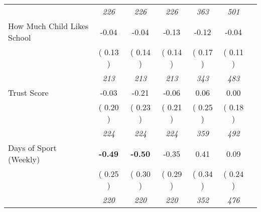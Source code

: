 \begin{tabular}{l c c c c c c}
& \textit{ 226 } & \textit{ 226 } & \textit{ 226 } & \textit{ 363 } & \textit{ 501 } \\
How Much Child Likes School &     -0.04 &     -0.04 &     -0.13 &     -0.12 &     -0.04 \\
& (     0.13 ) & (     0.14 ) & (     0.14 ) & (     0.17 ) & (     0.11 ) \\
& \textit{ 213 } & \textit{ 213 } & \textit{ 213 } & \textit{ 343 } & \textit{ 483 } \\
Trust Score &     -0.03 &     -0.21 &     -0.06 &      0.06 &      0.00 \\
& (     0.20 ) & (     0.23 ) & (     0.21 ) & (     0.25 ) & (     0.18 ) \\
& \textit{ 224 } & \textit{ 224 } & \textit{ 224 } & \textit{ 359 } & \textit{ 492 } \\
Days of Sport (Weekly) & \textbf{     -0.49 } & \textbf{     -0.50 } &     -0.35 &      0.41 &      0.09 \\
& (     0.25 ) & (     0.30 ) & (     0.29 ) & (     0.34 ) & (     0.24 ) \\
& \textit{ 220 } & \textit{ 220 } & \textit{ 220 } & \textit{ 352 } & \textit{ 476 } \\
\bottomrule
\end{tabular}
